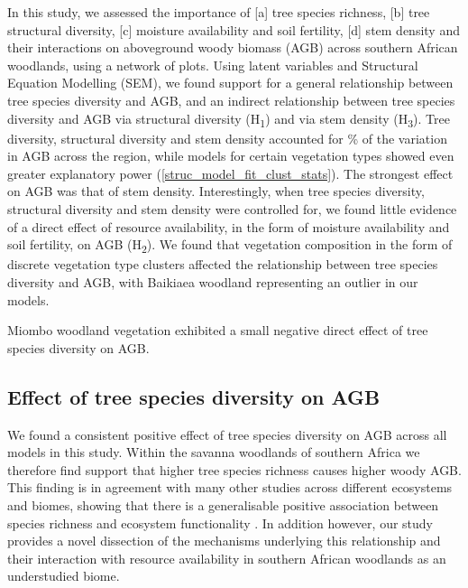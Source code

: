 \documentclass[11pt,a4paper]{article}
\begin{document}
In this study, we assessed the importance of [a] tree species richness, [b] tree structural diversity, [c] moisture availability and soil fertility, [d] stem density and their interactions on aboveground woody biomass (AGB) across southern African woodlands, using a network of \nplots{} plots. Using latent variables and Structural Equation Modelling (SEM), we found support for a general relationship between tree species diversity and AGB, and an indirect relationship between tree species diversity and AGB via structural diversity (H\textsubscript{1}) and via stem density (H\textsubscript{3}). Tree diversity, structural diversity and stem density accounted for \srsq{}\% of the variation in AGB across the region, while models for certain vegetation types showed even greater explanatory power (\autoref{struc_model_fit_clust_stats}). The strongest effect on AGB was that of stem density. Interestingly, when tree species diversity, structural diversity and stem density were controlled for, we found little evidence of a direct effect of resource availability, in the form of moisture availability and soil fertility, on AGB (H\textsubscript{2}). We found that vegetation composition in the form of discrete vegetation type clusters affected the relationship between tree species diversity and AGB, with Baikiaea woodland representing an outlier in our models.

Miombo woodland vegetation exhibited a small negative direct effect of tree species diversity on AGB.



\subsection{Effect of tree species diversity on AGB}


We found a consistent positive effect of tree species diversity on AGB across all models in this study. Within the savanna woodlands of southern Africa we therefore find support that higher tree species richness causes higher woody AGB. This finding is in agreement with many other studies across different ecosystems and biomes, showing that there is a generalisable positive association between species richness and ecosystem functionality \citep{Liang2016, Cardinale2009}. In addition however, our study provides a novel dissection of the mechanisms underlying this relationship and their interaction with resource availability in southern African woodlands as an understudied biome.
\end{document}
